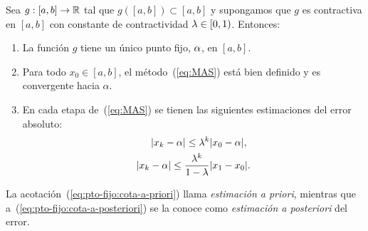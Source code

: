\begin{theorem}
  \label{thm:punto-fijo-Banach}
  Sea $g:[a,b]\to\operatorname{{\mathbb R}}$ tal que $g([a,b]) \subset [a,b]$ y supongamos
  que $g$ es contractiva en $[a,b]$ con constante de contractividad
  $\lambda\in [0,1)$. Entonces:
  \begin{enumerate}
  \item 
    \label{item:punto-fijo-Banach:1}
    La función $g$ tiene un \textsf{único punto fijo}, $\alpha$, en
    $[a,b]$.
  \item 
    \label{item:punto-fijo-Banach:2}
    Para todo $x_0\in [a,b]$, el método~(\ref{eq:MAS}) está bien
    definido y es \textsf{convergente} hacia $\alpha$.
  \item En cada etapa de~(\ref{eq:MAS}) se tienen las siguientes
    \textsf{estimaciones} del error absoluto:
    \label{item:punto-fijo-Banach:3}
    \begin{align}
      \label{eq:pto-fijo:cota-a-priori}
      |x_k-\alpha| \le \lambda^k &|x_0-\alpha|,
      \\
      \label{eq:pto-fijo:cota-a-posteriori}
      |x_k-\alpha| \le \frac{\lambda^k}{1-\lambda}
      &|x_1-x_0|.
    \end{align}
  \end{enumerate}
\end{theorem}

La acotación~(\ref{eq:pto-fijo:cota-a-priori}) llama
\textit{estimación a priori}, mientras que
a~(\ref{eq:pto-fijo:cota-a-posteriori}) se la conoce como
\textit{estimación a posteriori} del error.

